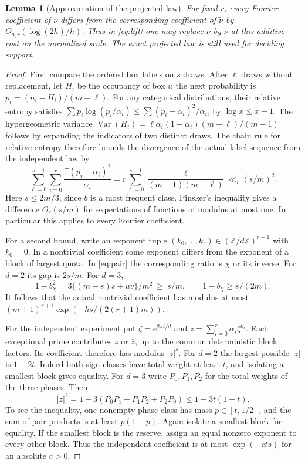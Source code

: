\documentclass[11pt,letterpaper]{article}
\newtheorem{lemma}[theorem]{Lemma}
\newcommand{\E}{\mathbb E}
\newcommand{\abs}[1]{\lvert#1\rvert}
\begin{document}
\begin{lemma}[Approximation of the projected law]\label{lem:iid}
For fixed \(r\), every Fourier coefficient of \(\nu\) differs from the corresponding coefficient of \(\widetilde\nu\) by \(O_{a,r}(\log(2h)/h)\). Thus in \eqref{eq:lift} one may replace \(\nu\) by \(\widetilde\nu\) at this additive cost on the normalized scale. The exact projected law is still used for deciding support.
\end{lemma}
\begin{proof}
First compare the ordered box labels on \(s\) draws. After \(\ell\) draws without replacement, let \(H_i\) be the occupancy of box \(i\); the next probability is \(p_i=(n_i-H_i)/(m-\ell)\). For any categorical distributions, their relative entropy satisfies
\(\sum p_i\log(p_i/\alpha_i)\le\sum(p_i-\alpha_i)^2/\alpha_i\), by \(\log x\le x-1\). The hypergeometric variance
\(\operatorname{Var}(H_i)=\ell\alpha_i(1-\alpha_i)(m-\ell)/(m-1)\) follows by expanding the indicators of two distinct draws. The chain rule for relative entropy therefore bounds the divergence of the actual label sequence from the independent law by
\[
  \sum_{\ell=0}^{s-1}\sum_{i=0}^r
       \frac{\E(p_i-\alpha_i)^2}{\alpha_i}
       =r\sum_{\ell=0}^{s-1}\frac{\ell}{(m-1)(m-\ell)}
       \ll_r(s/m)^2 .
\]
Here \(s\le2m/3\), since \(b\) is a most frequent class. Pinsker's inequality gives a difference \(O_r(s/m)\) for expectations of functions of modulus at most one. In particular this applies to every Fourier coefficient.

For a second bound, write an exponent tuple \((k_0,\ldots,k_r)\in(\mathbb Z/d\mathbb Z)^{r+1}\) with \(k_0=0\). In a nontrivial coefficient some exponent differs from the exponent of a block of largest quota. In \eqref{eq:pair} the corresponding ratio is \(\chi\) or its inverse. For \(d=2\) its gap is \(2s/m\). For \(d=3\),
\[
 1-b_\chi^2=3\{(m-s)s+uv\}/m^2\ \ge\ s/m,
 \qquad 1-b_\chi\ge s/(2m).
\]
It follows that the actual nontrivial coefficient has modulus at most
\((m+1)^{r+1}\exp(-hs/(2(r+1)m))\).

For the independent experiment put \(\zeta=e^{2\pi i/d}\) and \(z=\sum_{i=0}^r\alpha_i\zeta^{k_i}\). Each exceptional prime contributes \(z\) or \(\bar z\), up to the common deterministic block factors. Its coefficient therefore has modulus \(\abs z^s\). For \(d=2\) the largest possible \(\abs z\) is \(1-2t\). Indeed both sign classes have total weight at least \(t\), and isolating a smallest block gives equality. For \(d=3\) write \(P_0,P_1,P_2\) for the total weights of the three phases. Then
\[
 |z|^2=1-3(P_0P_1+P_1P_2+P_2P_0)\le1-3t(1-t).
\]
To see the inequality, one nonempty phase class has mass \(p\in[t,1/2]\), and the sum of pair products is at least \(p(1-p)\). Again isolate a smallest block for equality. If the smallest block is the reserve, assign an equal nonzero exponent to every other block. Thus the independent coefficient is at most \(\exp(-c ts)\) for an absolute \(c>0\).


\end{proof}
\end{document}
